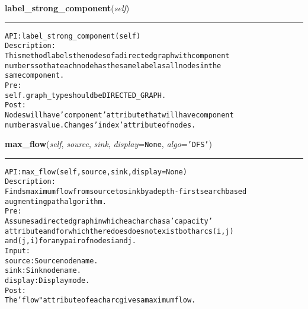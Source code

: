 \hspace{.8\funcindent}\begin{boxedminipage}{\funcwidth}

    \raggedright \textbf{label\_strong\_component}(\textit{self})

    \vspace{-1.5ex}

    \rule{\textwidth}{0.5\fboxrule}
\setlength{\parskip}{2ex}
\begin{alltt}

API: label\_strong\_component(self)
Description:
This method labels the nodes of a directed graph with component
numbers so that each node has the same label as all nodes in the
same component.
Pre:
    self.graph\_type should be DIRECTED\_GRAPH.
Post:
    Nodes will have 'component' attribute that will have component
    number as value. Changes 'index' attribute of nodes.
\end{alltt}

\setlength{\parskip}{1ex}
    \end{boxedminipage}

    \label{coinor:gimpy:graph:Graph:max_flow}

    \vspace{0.5ex}

\hspace{.8\funcindent}\begin{boxedminipage}{\funcwidth}

    \raggedright \textbf{max\_flow}(\textit{self}, \textit{source}, \textit{sink}, \textit{display}={\tt None}, \textit{algo}={\tt \texttt{'}\texttt{DFS}\texttt{'}})

    \vspace{-1.5ex}

    \rule{\textwidth}{0.5\fboxrule}
\setlength{\parskip}{2ex}
\begin{alltt}

API: max\_flow(self, source, sink, display=None)
Description:
Finds maximum flow from source to sink by a depth-first search based
augmenting path algorithm.
Pre:
    Assumes a directed graph in which each arc has a 'capacity'
    attribute and for which there does does not exist both arcs (i,j)
    and (j, i) for any pair of nodes i and j.
Input:
    source: Source node name.
    sink: Sink node name.
    display: Display mode.
Post:
    The 'flow" attribute of each arc gives a maximum flow.
\end{alltt}

\setlength{\parskip}{1ex}
    \end{boxedminipage}

